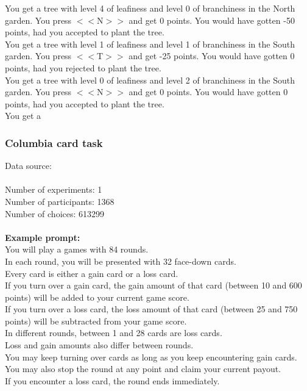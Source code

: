 \documentclass[pdflatex,sn-nature]{sn-jnl}%
\theoremstyle{thmstyleone}%
\theoremstyle{thmstyletwo}%
\theoremstyle{thmstylethree}%
\begin{document}
You get a tree with level 4 of leafiness and level 0 of branchiness in the North garden. You press $<<$N$>>$ and get 0 points. You would have gotten -50 points, had you accepted to plant the tree. $~$\\ 
You get a tree with level 1 of leafiness and level 1 of branchiness in the South garden. You press $<<$T$>>$ and get -25 points. You would have gotten 0 points, had you rejected to plant the tree. $~$\\ 
You get a tree with level 0 of leafiness and level 2 of branchiness in the South garden. You press $<<$N$>>$ and get 0 points. You would have gotten 0 points, had you accepted to plant the tree. $~$\\ 
You get a  

\subsubsection*{Columbia card task}
Data source: \cite{frey2017risk} \\ $~$ \\ 
Number of experiments: 1 $~$\\ 
Number of participants: 1368 $~$\\ 
Number of choices: 613299 $~$\\ 
 $~$\\ 
\textbf{Example prompt:}
 $~$\\ 
You will play a games with 84 rounds. $~$\\ 
In each round, you will be presented with 32 face-down cards. $~$\\ 
Every card is either a gain card or a loss card. $~$\\ 
If you turn over a gain card, the gain amount of that card (between 10 and 600 points) will be added to your current game score. $~$\\ 
If you turn over a loss card, the loss amount of that card (between 25 and 750 points) will be subtracted from your game score. $~$\\ 
In different rounds, between 1 and 28 cards are loss cards. $~$\\ 
Loss and gain amounts also differ between rounds. $~$\\ 
You may keep turning over cards as long as you keep encountering gain cards. $~$\\ 
You may also stop the round at any point and claim your current payout.  $~$\\ 
If you encounter a loss card, the round ends immediately. $~$\\ 
\end{document}

